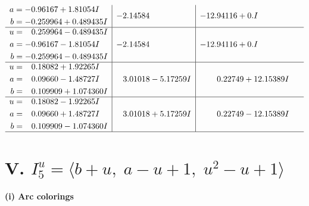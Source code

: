 \documentclass[1p]{elsarticle_modified}
\theoremstyle{definition}
\begin{document}
$$\begin{array}{c|c|c}
\begin{aligned}
a &= -0.96167 + 1.81054 I \\
b &= -0.259964 + 0.489435 I\end{aligned}
 & -2.14584\phantom{ +0.000000I} & -12.94116 + 0. I\phantom{ +0.000000I} \\ \hline\begin{aligned}
u &= \phantom{-}0.259964 - 0.489435 I \\
a &= -0.96167 - 1.81054 I \\
b &= -0.259964 - 0.489435 I\end{aligned}
 & -2.14584\phantom{ +0.000000I} & -12.94116 + 0. I\phantom{ +0.000000I} \\ \hline\begin{aligned}
u &= \phantom{-}0.18082 + 1.92265 I \\
a &= \phantom{-}0.09660 - 1.48727 I \\
b &= \phantom{-}0.109909 + 1.074360 I\end{aligned}
 & \phantom{-}3.01018 - 5.17259 I & \phantom{-}0.22749 + 12.15389 I \\ \hline\begin{aligned}
u &= \phantom{-}0.18082 - 1.92265 I \\
a &= \phantom{-}0.09660 + 1.48727 I \\
b &= \phantom{-}0.109909 - 1.074360 I\end{aligned}
 & \phantom{-}3.01018 + 5.17259 I & \phantom{-}0.22749 - 12.15389 I\\
 \hline 
 \end{array}$$\newpage\newpage\renewcommand{\arraystretch}{1}
\centering \section*{V. $I^u_{5}= \langle b+u,\;a- u+1,\;u^2- u+1 \rangle$}
\flushleft \textbf{(i) Arc colorings}\\
\end{document}
